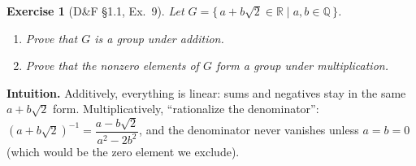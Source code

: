 \documentclass[12pt]{article}
\newtheorem{exercise}[theorem]{Exercise}
\theoremstyle{definition}
\begin{document}
\newpage

\begin{exercise}[D\&F §1.1, Ex.~9]
Let $G=\{\,a+b\sqrt{2}\in\mathbb{R}\mid a,b\in\mathbb{Q}\,\}$.
\begin{enumerate}
\item Prove that $G$ is a group under addition.
\item Prove that the nonzero elements of $G$ form a group under multiplication.
\end{enumerate}
\end{exercise}

\dotfill

\noindent
\textbf{Intuition.}
Additively, everything is linear: sums and negatives stay in the same $a+b\sqrt2$ form.
Multiplicatively, “rationalize the denominator”: $(a+b\sqrt2)^{-1}=\dfrac{a-b\sqrt2}{a^2-2b^2}$, and the
denominator never vanishes unless $a=b=0$ (which would be the zero element we exclude).

\dotfill
\end{document}
